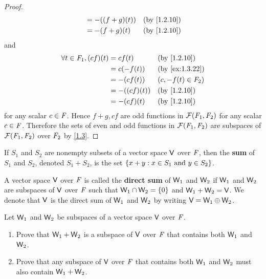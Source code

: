 \begin{proof}
\begin{align*}
                                   & = -((f + g)(t))  &  & \text{(by \cref{1.2.10})}    \\
                                   & = -(f + g)(t)    &  & \text{(by \cref{1.2.10})}
  \end{align*}
  and
  \begin{align*}
    \forall t \in \F_1, (cf)(t) & = cf(t)      &  & \text{(by \cref{1.2.10})}    \\
                                & = c(-f(t))   &  & \text{(by \cref{ex:1.3.22})} \\
                                & = -(cf(t))   &  & (c, -f(t) \in \F_2)          \\
                                & = -((cf)(t)) &  & \text{(by \cref{1.2.10})}    \\
                                & = -(cf)(t)   &  & \text{(by \cref{1.2.10})}
  \end{align*}
  for any scalar \(c \in \mathit{F}\).
  Hence \(f + g, cf\) are odd functions in \(\fs{\F_1}{\F_2}\) for any scalar \(c \in \mathit{F}\).
  Therefore the sets of even and odd functions in \(\fs{\F_1}{\F_2}\) are subspaces of \(\fs{\F_1}{\F_2}\) over \(\mathit{F}_2\) by \cref{1.3}.
\end{proof}

\begin{defn}\label{1.3.10}
  If \(S_1\) and \(S_2\) are nonempty subsets of a vector space \(\mathsf{V}\) over \(\mathit{F}\), then the \textbf{sum} of \(S_1\) and \(S_2\), denoted \(S_1 + S_2\), is the set \(\left\lbrace x + y : x \in S_1 \text{ and } y \in S_2\right\rbrace\).
\end{defn}

\begin{defn}\label{1.3.11}
  A vector space \(\mathsf{V}\) over \(\mathit{F}\) is called the \textbf{direct sum} of \(\mathsf{W}_1\) and \(\mathsf{W}_2\) if \(\mathsf{W}_1\) and \(\mathsf{W}_2\) are subspaces of \(\mathsf{V}\) over \(\mathit{F}\) such that \(\mathsf{W}_1 \cap \mathsf{W}_2 = \left\lbrace0\right\rbrace\) and \(\mathsf{W}_1 + \mathsf{W}_2 = \mathsf{V}\).
  We denote that \(\mathsf{V}\) is the direct sum of \(\mathsf{W}_1\) and \(\mathsf{W}_2\) by writing \(\mathsf{V} = \mathsf{W}_1 \oplus \mathsf{W}_2\).
\end{defn}

\begin{ex}\label{ex:1.3.23}
  Let \(\mathsf{W}_1\) and \(\mathsf{W}_2\) be subspaces of a vector space \(\mathsf{V}\) over \(\mathit{F}\).
  \begin{enumerate}
    \item Prove that \(\mathsf{W}_1 + \mathsf{W}_2\) is a subspace of \(\mathsf{V}\) over \(\mathit{F}\) that contains both \(\mathsf{W}_1\) and \(\mathsf{W}_2\).
    \item Prove that any subspace of \(\mathsf{V}\) over \(\mathit{F}\) that contains both \(\mathsf{W}_1\) and \(\mathsf{W}_2\) must also contain \(\mathsf{W}_1 + \mathsf{W}_2\).
  \end{enumerate}
\end{ex}

